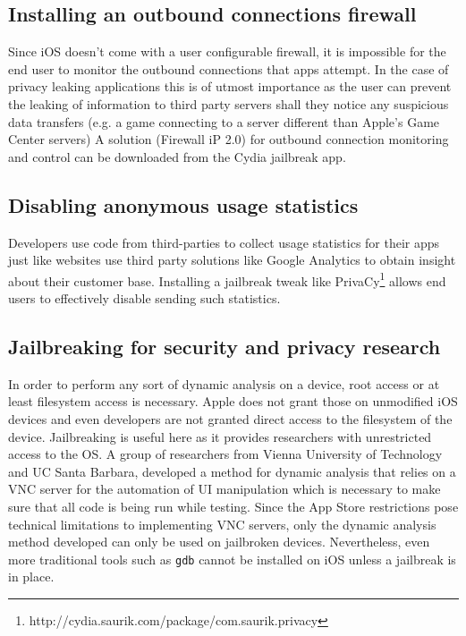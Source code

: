 \documentclass[12pt, titlepage, oneside]{article}
\begin{document}
\subsection{Installing an outbound connections firewall}
Since iOS doesn't come with a user configurable firewall, it is impossible for the end user to monitor the outbound connections that apps attempt. In the case of privacy leaking applications this is of utmost importance as the user can prevent the leaking of information to third party servers shall they notice any suspicious data transfers (e.g. a game connecting to a server different than Apple's Game Center servers) A solution (Firewall iP 2.0) for outbound connection monitoring and control can be downloaded from the Cydia jailbreak app.
\subsection{Disabling anonymous usage statistics}

Developers use code from third-parties to collect usage statistics for their apps just like websites use third party solutions like Google Analytics to obtain insight about their customer base. Installing a jailbreak tweak like PrivaCy\footnote{http://cydia.saurik.com/package/com.saurik.privacy} allows end users to effectively disable sending such statistics.

\subsection{Jailbreaking for security and privacy research}
In order to perform any sort of dynamic analysis on a device, root access or at least filesystem access is necessary. Apple does not grant those on unmodified iOS devices and even developers are not granted direct access to the filesystem of the device. Jailbreaking is useful here as it provides researchers with unrestricted access to the OS. 
A group of researchers from Vienna University of Technology and UC Santa Barbara\cite{dynamic}, developed a method for dynamic analysis that relies on a VNC server for the automation of UI manipulation which is necessary to make sure that all code is being run while testing. Since the App Store restrictions pose technical limitations to implementing VNC servers, only the dynamic analysis method developed can only be used on jailbroken devices. Nevertheless, even more traditional tools such as \texttt{gdb} cannot be installed on iOS unless a jailbreak is in place.
\end{document}
